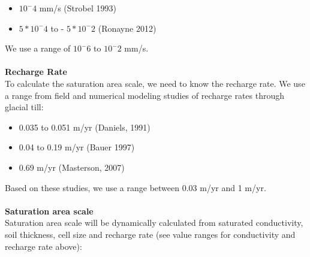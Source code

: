 \documentclass[12pt]{article}
\begin{document}
{\begin{itemize}
\item $10^-4$ mm/s (Strobel 1993)

\item $5 * 10^-4$ to  - $5 * 10^-2$ (Ronayne 2012)
\end{itemize}
\noindent
We use a range of $10^-6$ to $10^-2$ mm/s.
\\
\\
\noindent
{\textbf{Recharge Rate}}
\\
\noindent
To calculate the saturation area scale, we need to know the recharge rate. We use a range from field and numerical modeling studies of recharge rates through glacial till:
\begin{itemize}
\item 
0.035 to 0.051 m/yr (Daniels, 1991)
\item 
0.04 to 0.19 m/yr (Bauer 1997) 
\item
0.69 m/yr (Masterson, 2007)
\end{itemize}
\noindent
Based on these studies, we use a range between 0.03 m/yr and 1 m/yr. 
\\
\\
{\textbf{Saturation area scale}}
\\
\noindent
Saturation area scale will be dynamically calculated from saturated conductivity, soil thickness, cell size and recharge rate (see value ranges for conductivity and recharge rate above):

}
\end{document}
